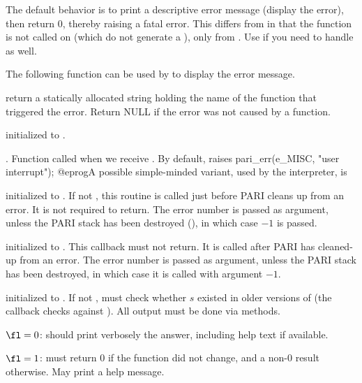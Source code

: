 The default behavior is to print a descriptive error
message (display the error), then return 0, thereby raising a fatal error.
This differs from  in that the
function is not called on  (which do not generate a ),
only from . Use  if you need to handle
 as well.

The following function can be used by  to display
the error message.

 return a statically allocated string
holding the name of the function that triggered the error. Return NULL if the
error was not caused by a function.

initialized to .

.
Function called when we receive . By default, raises
\bprog
  pari_err(e_MISC, "user interrupt");
@eprog\noindent A possible simple-minded variant, used by the
 interpreter, is


initialized to . If not , this routine is called just
before PARI cleans up from an error. It is not required to return.  The error
number is passed as argument, unless the PARI stack has been destroyed
(), in which case $-1$ is passed.

initialized to . This callback must not return.
It is called after PARI has cleaned-up from an error. The error number is
passed as argument, unless the PARI stack has been destroyed, in which case
it is called with argument $-1$.

 initialized to . If not , must check whether $s$
existed in older versions of  (the  callback checks against
). All output must be done via  methods.

\item $\fl = 0$: should print verbosely the answer, including help text if
available.

\item $\fl = 1$: must return $0$ if the function did not change, and a
non-$0$ result otherwise. May print a help message.

